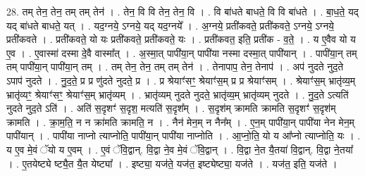 \documentclass[17pt]{extarticle}
\begin{document}
28. तम् तेन॒ तेन॒ तम् तम् तेन॑ । . तेन॒ वि वि तेन॒ तेन॒ वि । . वि बा॑धते बाधते॒ वि वि बा॑धते । . बा॒ध॒ते॒ यद् यद् बा॑धते बाधते॒ यत् । . यद॒ग्नये॒ ऽग्नये॒ यद् यद॒ग्नये᳚ । . अ॒ग्नये॒ प्रती॑कवते॒ प्रती॑कवते॒ ऽग्नये॒ ऽग्नये॒ प्रती॑कवते । . प्रती॑कवते॒ यो यः प्रती॑कवते॒ प्रती॑कवते॒ यः । . प्रती॑कवत॒ इति॒ प्रती॑क - व॒ते॒ । . य ए॒वैव यो य ए॒व । . ए॒वास्मा॑ दस्मा दे॒वै वास्मा᳚त् । . अ॒स्मा॒त् पापी॑या॒न् पापी॑या नस्मा दस्मा॒त् पापी॑यान् । . पापी॑या॒न् तम् तम् पापी॑या॒न् पापी॑या॒न् तम् । . तम् तेन॒ तेन॒ तम् तम् तेन॑ । . तेनापाप॒ तेन॒ तेनाप॑ । . अप॑ नुदते नुद॒ते ऽपाप॑ नुदते । . नु॒द॒ते॒ प्र प्र णु॑दते नुदते॒ प्र । . प्र श्रेयाꣳ॑सꣳ॒॒ श्रेयाꣳ॑स॒म् प्र प्र श्रेयाꣳ॑सम् । . श्रेयाꣳ॑स॒म् भ्रातृ॑व्य॒म् भ्रातृ॑व्यꣳ॒॒ श्रेयाꣳ॑सꣳ॒॒ श्रेयाꣳ॑स॒म् भ्रातृ॑व्यम् । . भ्रातृ॑व्यम् नुदते नुदते॒ भ्रातृ॑व्य॒म् भ्रातृ॑व्यम् नुदते । . नु॒द॒ते ऽत्यति॑ नुदते नुद॒ते ऽति॑ । . अति॑ स॒दृशꣳ॑ स॒दृश॒ मत्यति॑ स॒दृश᳚म् । . स॒दृश॑म् क्रामति क्रामति स॒दृशꣳ॑ स॒दृश॑म् क्रामति । . क्रा॒म॒ति॒ न न क्रा॑मति क्रामति॒ न । . नैन॑ मेन॒म् न नैन᳚म् । . ए॒न॒म् पापी॑या॒न् पापी॑या नेन मेन॒म् पापी॑यान् । . पापी॑या नाप्नो त्याप्नोति॒ पापी॑या॒न् पापी॑या नाप्नोति । . आ॒प्नो॒ति॒ यो य आ᳚प्नो त्याप्नोति॒ यः । . य ए॒व मे॒वं ॅयो य ए॒वम् । . ए॒वं ॅवि॒द्वान्. वि॒द्वा ने॒व मे॒वं ॅवि॒द्वान् । . वि॒द्वा ने॒त यै॒तया॑ वि॒द्वान्. वि॒द्वा ने॒तया᳚ । . ए॒तयेष्ट्ये ष्ट्यै॒त यै॒त येष्ट्या᳚ । . इष्ट्या॒ यज॑ते॒ यज॑त॒ इष्ट्येष्ट्या॒ यज॑ते । . यज॑त॒ इति॒ यज॑ते । \newline
\end{document}
